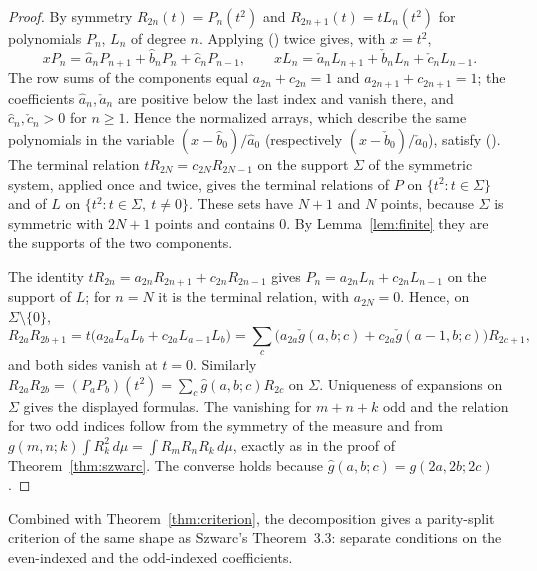 \documentclass[twoside,10pt]{article}
\numberwithin{equation}{section}
\theoremstyle{slbody}
\theoremstyle{definition}
\theoremstyle{remark}
\renewcommand{\eqref}[1]{\textup{{\normalfont(\oldstylenums{\ref{#1}}}\normalfont)}}
\begin{document}
\begin{proof}
By symmetry $R_{2n}(t)=P_n(t^2)$ and $R_{2n+1}(t)=tL_n(t^2)$ for polynomials $P_n$, $L_n$ of degree $n$. Applying \eqref{eq:recurrence} twice gives, with $x=t^2$,
\[
xP_n=\hat a_nP_{n+1}+\hat b_nP_n+\hat c_nP_{n-1},\qquad
xL_n=\check a_nL_{n+1}+\check b_nL_n+\check c_nL_{n-1}.
\]
The row sums of the components equal $a_{2n}+c_{2n}=1$ and $a_{2n+1}+c_{2n+1}=1$; the coefficients $\hat a_n,\check a_n$ are positive below the last index and vanish there, and $\hat c_n,\check c_n>0$ for $n\geq1$. Hence the normalized arrays, which describe the same polynomials in the variable $(x-\hat b_0)/\hat a_0$ (respectively $(x-\check b_0)/\check a_0$), satisfy \eqref{eq:basic}. The terminal relation $tR_{2N}=c_{2N}R_{2N-1}$ on the support $\Sigma$ of the symmetric system, applied once and twice, gives the terminal relations of $P$ on $\{t^2:t\in\Sigma\}$ and of $L$ on $\{t^2:t\in\Sigma,\ t\neq0\}$. These sets have $N+1$ and $N$ points, because $\Sigma$ is symmetric with $2N+1$ points and contains $0$. By Lemma~\ref{lem:finite} they are the supports of the two components.

The identity $tR_{2n}=a_{2n}R_{2n+1}+c_{2n}R_{2n-1}$ gives $P_n=a_{2n}L_n+c_{2n}L_{n-1}$ on the support of $L$; for $n=N$ it is the terminal relation, with $a_{2N}=0$. Hence, on $\Sigma\setminus\{0\}$,
\[
R_{2a}R_{2b+1}=t\big(a_{2a}L_aL_b+c_{2a}L_{a-1}L_b\big)=\sum_c\big(a_{2a}\check g(a,b;c)+c_{2a}\check g(a-1,b;c)\big)R_{2c+1},
\]
and both sides vanish at $t=0$. Similarly $R_{2a}R_{2b}=(P_aP_b)(t^2)=\sum_c\hat g(a,b;c)R_{2c}$ on $\Sigma$. Uniqueness of expansions on $\Sigma$ gives the displayed formulas. The vanishing for $m+n+k$ odd and the relation for two odd indices follow from the symmetry of the measure and from $g(m,n;k)\int R_k^2\,d\mu=\int R_mR_nR_k\,d\mu$, exactly as in the proof of Theorem~\ref{thm:szwarc}. The converse holds because $\hat g(a,b;c)=g(2a,2b;2c)$.
\end{proof}

Combined with Theorem~\ref{thm:criterion}, the decomposition gives a parity-split criterion of the same shape as Szwarc's Theorem~3.3: separate conditions on the even-indexed and the odd-indexed coefficients.
\end{document}
